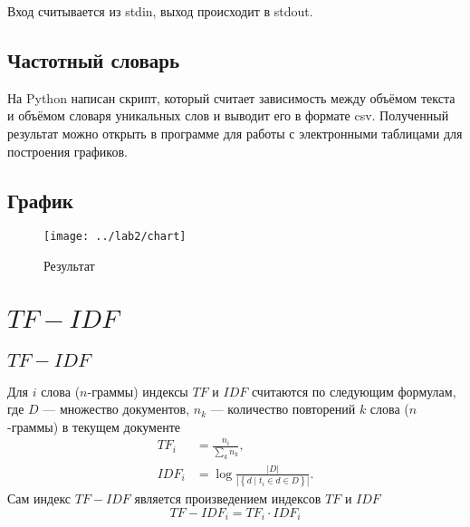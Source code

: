 Вход считывается из stdin, выход происходит в stdout.

\lstset{inputencoding=utf8, extendedchars=\true}


\section{Частотный словарь}
На Python написан скрипт, который считает зависимость между объёмом текста
и объёмом словаря уникальных слов и выводит его в формате csv.
Полученный результат можно открыть в программе для работы
с электронными таблицами для построения графиков.

\lstset{inputencoding=utf8, extendedchars=\true}


\section{График}
\begin{figure}[h]
  \centering
  \texttt{[image: ../lab2/chart]}
  \caption{Результат}
\end{figure}

\chapter{$TF-IDF$}

\section{$TF-IDF$}
Для $i$ слова ($n$-граммы) индексы $TF$ и $IDF$ считаются
по следующим формулам, где
$D$ --- множество документов,
$n_k$ --- количество повторений $k$ слова ($n$-граммы) в текущем документе
\cite{Jones}
\begin{equation*}
  \begin{split}
    TF_i  &= \frac{n_i}{\sum_{k} n_k}, \\
    IDF_i &= \log {\frac{\left| D \right|}{
                   \left| \left\{ d \mid t_i \in d \in D \right\} \right|}}.
  \end{split}
\end{equation*}
Сам индекс $TF-IDF$ является произведением индексов $TF$ и $IDF$
\begin{equation*}
  TF-IDF_i = TF_i \cdot IDF_i
\end{equation*}

